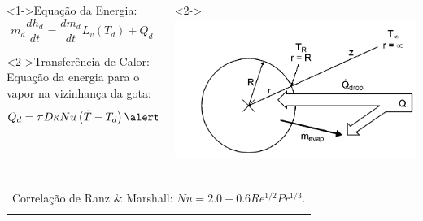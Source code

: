 \documentclass[bars,mathserif]{beamer}
\begin{document}
\begin{frame}
\begin{columns}
 \begin{column}{0.5\textwidth}
  \begin{block}<1->{Equação da Energia:}
 \begin{equation*}
 m_d \frac{dh_d}{dt} = \frac{d m_d}{dt} L_v \left(T_d\right)+Q_d 
\end{equation*}
\end{block}
\begin{block}<2->{Transferência de Calor:}
Equação da energia para o vapor na vizinhança da gota:
\begin{equation*}
Q_d = \pi D \kappa Nu \left( \tilde{T}-T_d \right)  \alert{\frac{z}{e^z-1}}
\end{equation*}
\end{block}
 \end{column}
\begin{column}{0.5\textwidth}
\begin{block}<2->
\centering
 \includegraphics[width=\textwidth]{./imgs/spray_energy.png}
\end{block}  
 \end{column}
\end{columns}
%
\footnotesize
\begin{tabular}{|l|}
\hline \\
Correlação de Ranz \& Marshall:  $Nu= 2.0 +0.6 Re^{1/2} Pr^{1/3}$.\\ \\
\hline 
\end{tabular}
%
\end{frame}
%
\end{document}
